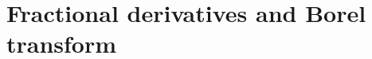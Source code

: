 \documentclass[11pt,a4paper,twoside,leqno,noamsfonts]{amsart}
\numberwithin{equation}{section}
\begin{document}
%

\section{Fractional derivatives and Borel transform}
\end{document}
